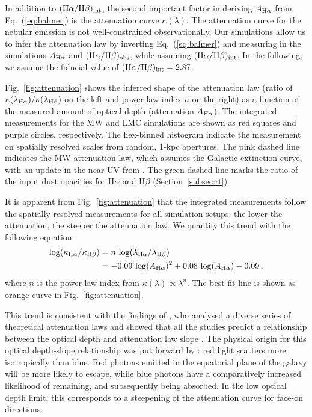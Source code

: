 \documentclass[fleqn,usenatbib]{mnras}
\begin{document}
In addition to $(\mathrm{H}\alpha/\mathrm{H}\beta)_{\rm int}$, the second important factor in deriving $A_{\rm H\alpha}$ from Eq.~(\ref{eq:balmer}) is the attenuation curve $\kappa(\lambda)$. The attenuation curve for the nebular emission is not well-constrained observationally. Our simulations allow us to infer the attenuation law by inverting Eq.~(\ref{eq:balmer}) and measuring in the simulations $A_{\rm H\alpha}$ and $(\mathrm{H}\alpha/\mathrm{H}\beta)_{\rm obs}$, while assuming $(\mathrm{H}\alpha/\mathrm{H}\beta)_{\rm int}$. In the following, we assume the fiducial value of $(\mathrm{H}\alpha/\mathrm{H}\beta)_{\rm int}=2.87$.

Fig.~\ref{fig:attenuation} shows the inferred shape of the attenuation law (ratio of $\kappa(\lambda_{\rm H\alpha})/\kappa(\lambda_{\rm H\beta})$ on the left and power-law index $n$ on the right) as a function of the measured amount of optical depth (attenuation $A_{\rm H\alpha}$). The integrated measurements for the MW and LMC simulations are shown as red squares and purple circles, respectively. The hex-binned histogram indicate the measurement on spatially resolved scales from random, 1-kpc apertures. The pink dashed line indicates the MW attenuation law, which assumes the \citet{cardelli89} Galactic extinction curve, with an update in the near-UV from \cite{odonnell94}. The green dashed line marks the ratio of the input dust opacities for H$\alpha$ and H$\beta$ (Section~\ref{subsec:rt}).

It is apparent from Fig.~\ref{fig:attenuation} that the integrated measurements follow the spatially resolved measurements for all simulation setups: the lower the attenuation, the steeper the attenuation law. We quantify this trend with the following equation:
\begin{align}
        \log(\kappa_{\rm H\alpha}/\kappa_{\rm H\beta}) &= n\,\log(\lambda_{\rm H\alpha}/\lambda_{\rm H\beta}) \notag \\
         &= -0.09\,\log(A_{\rm H\alpha})^2 + 0.08 \,\log(A_{\rm H\alpha}) - 0.09 \, ,
\label{eq:slope_tau}
\end{align}
where $n$ is the power-law index from $\kappa(\lambda)\propto\lambda^n$. The best-fit line is shown as orange curve in Fig.~\ref{fig:attenuation}.

This trend is consistent with the findings of \citet{chevallard13}, who analysed a diverse series of theoretical attenuation laws and showed that all the studies predict a relationship between the optical depth and attenuation law slope \citep[see also][]{narayanan18, trayford19, salim20}. The physical origin for this optical depth-slope relationship was put forward by \citet{chevallard13}: red light scatters more isotropically than blue. Red photons emitted in the equatorial plane of the galaxy will be more likely to escape, while blue photons have a comparatively increased likelihood of remaining, and subsequently being absorbed. In the low optical depth limit, this corresponds to a steepening of the attenuation curve for face-on directions. 
\end{document}
